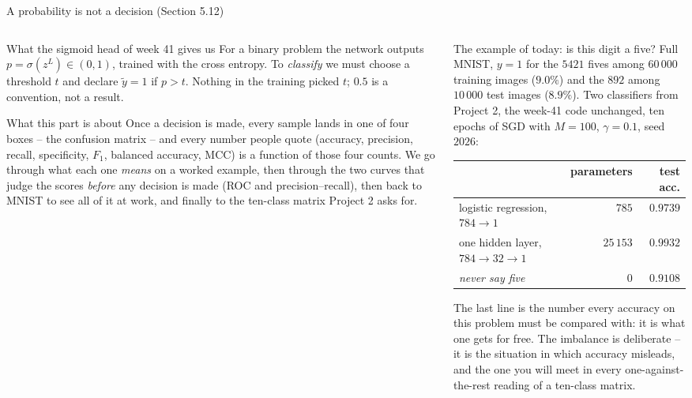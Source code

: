 \documentclass[10pt,aspectratio=169]{beamer}
\begin{document}

\begin{frame}{A probability is not a decision (Section 5.12)}
\small
\begin{columns}[T]
\begin{column}{0.5\textwidth}
\begin{block}{What the sigmoid head of week 41 gives us}
\scriptsize
For a binary problem the network outputs $p=\sigma(z^{L})\in(0,1)$, trained
with the cross entropy.  To \emph{classify} we must choose a threshold $t$
and declare $\tilde{y}=1$ if $p>t$.  Nothing in the training picked $t$;
$0.5$ is a convention, not a result.
\end{block}
\begin{block}{What this part is about}
\scriptsize
Once a decision is made, every sample lands in one of four boxes -- the
confusion matrix -- and every number people quote (accuracy, precision,
recall, specificity, $F_1$, balanced accuracy, MCC) is a function of those
four counts.  We go through what each one \emph{means} on a worked
example, then through the two curves that judge the scores \emph{before}
any decision is made (ROC and precision--recall), then back to MNIST to
see all of it at work, and finally to the ten-class matrix Project 2 asks
for.
\end{block}
\end{column}
\begin{column}{0.48\textwidth}
\begin{block}{The example of today: is this digit a five?}
\scriptsize
Full MNIST, $y=1$ for the $5421$ fives among $60\,000$ training images
($9.0\%$) and the $892$ among $10\,000$ test images ($8.9\%$).  Two
classifiers from Project 2, the week-41 code unchanged, ten epochs of SGD
with $M=100$, $\gamma=0.1$, seed $2026$:
\begin{center}
\setlength{\tabcolsep}{4pt}
\begin{tabular}{@{}lrr@{}}
\toprule
 & parameters & test acc.\\
\midrule
logistic regression, $784\to1$ & $785$ & $0.9739$\\
one hidden layer, $784\to32\to1$ & $25\,153$ & $0.9932$\\
\midrule
\emph{never say five} & $0$ & $0.9108$\\
\bottomrule
\end{tabular}
\end{center}
The last line is the number every accuracy on this problem must be compared
with: it is what one gets for free.  The imbalance is deliberate -- it is
the situation in which accuracy misleads, and the one you will meet in
every one-against-the-rest reading of a ten-class matrix.
\end{block}
\end{column}
\end{columns}
\end{frame}
\end{document}
